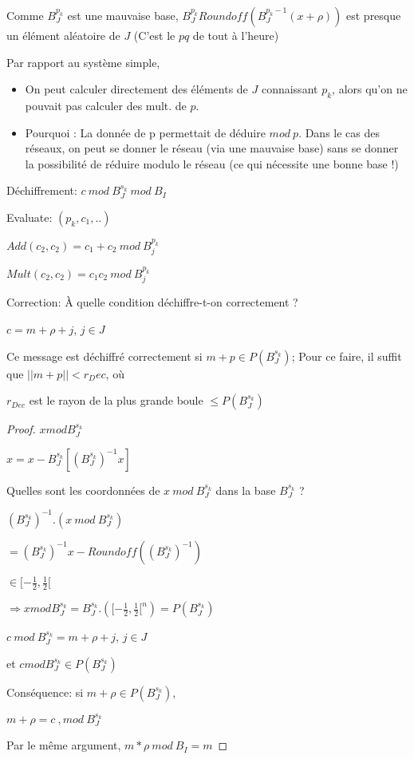 Comme $B_J^{p_k}$ est une mauvaise base, $B_J^{p_k} Roundoff(B_J^{p_k-1} (x+ \rho))$ est presque un élément aléatoire de $J$ (C'est le $p q$ de tout à l'heure)

Par rapport au système simple,

\begin{itemize}
\item On peut calculer directement des éléments de $J$ connaissant $p_k$, alors qu'on ne pouvait pas calculer des mult. de $p$.
\item Pourquoi : La donnée de p permettait de déduire $mod \ p$. Dans le cas des réseaux, on peut se donner le réseau (via une mauvaise base) sans se donner la possibilité de réduire modulo le réseau (ce qui nécessite une bonne base !)
\end{itemize}

Déchiffrement: $c \ mod \ B_J^{s_k} \ mod \ B_I$

Evaluate: $(p_k,c_1,..)$

$Add(c_2,c_2)=c_1+c_2 \ mod \ B_j^{p_k}$

$Mult(c_2,c_2)=c_1 c_2 \ mod \ B_j^{p_k}$

Correction: À quelle condition déchiffre-t-on correctement ?

$c=m+\rho+j$, $j \in J$

\begin{theorem}
Ce message est déchiffré correctement si $m+p \in P(B_J^{s_k})$;
Pour ce faire, il suffit que $||m+p|| < r_Dec$, où

$r_{Dec}$ est le rayon de la plus grande boule $\leq P(B_J^{s_k})$
\end{theorem}

\begin{proof}
$x mod B_J^{s_k}$

$x = x - B_J^{s_k} [(B_J^{s_k})^{-1} x]$

Quelles sont les coordonnées de $x \ mod \ B_J^{s_k}$ dans la base $B_J^{s_k}$ ?

$(B_J^{s_k})^{-1}. (x \ mod \ B_J^{s_k})$

$= (B_J^{s_k})^{-1} x - Roundoff((B_J^{s_k})^{-1})$

$\in [- \frac{1}{2},\frac{1}{2}[$

$\Rightarrow x mod B_J^{s_k}= B_J^{s_k}.([- \frac{1}{2},\frac{1}{2}[^n)=P(B_J^{s_k})$

$c \ mod \ B_J^{s_k}=m+\rho+j$, $j \in J$

et $c mod B_J^{s_k} \in P(B_J^{s_k})$

Conséquence: si $m+\rho \in P(B_J^{s_k})$,

$m+\rho = c \ ,mod \ B_J^{s_k}$

Par le même argument, $m * \rho \ mod \ B_I = m$
\end{proof}

